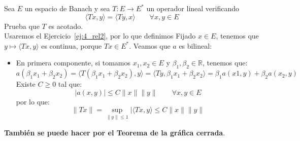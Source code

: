 \begin{ejercicio} %
    Sea $E$ un espacio de Banach y sea $T:E\to E^\ast$ un operador lineal verificando 
    \begin{equation*}
        \langle Tx,y \rangle  = \langle Ty,x \rangle  \qquad \forall x,y\in E
    \end{equation*}
    Prueba que $T$ es acotado.\\

    \noindent
    Usaremos el Ejercicio~\ref{ej:4_rel2}, por lo que definimos
    Fijado $x\in E$, tenemos que $y\longmapsto \langle Tx,y \rangle $ es continua, porque $Tx\in E^\ast$. Veamos que $a$ es bilineal:
    \begin{itemize}
        \item En primera componente, si tomamos $x_1,x_2\in E$ y $\beta_1,\beta_2\in \mathbb{R}$, tenemos que:
            \begin{equation*}
                a(\beta_1x_1+\beta_2x_2) = \langle T(\beta_1x_1 + \beta_2x_2),y \rangle  = \langle Ty , \beta_1x_1 + \beta_2x_2 \rangle  = \beta_1a(x1,y) + \beta_2a(x_2,y)
            \end{equation*}
            Existe $C\geq 0$ tal que:
            \begin{equation*}
                |a(x,y)| \leq C \|x\|\|y\| \qquad \forall x,y\in E
            \end{equation*}
            por lo que:
            \begin{equation*}
                \|Tx\| = \sup_{\|y\|\leq 1}|\langle Tx,y \rangle  \leq C \|x\|\|y\|
            \end{equation*}
    \end{itemize}
    \textbf{También se puede hacer por el Teorema de la gráfica cerrada}.
\end{ejercicio}

